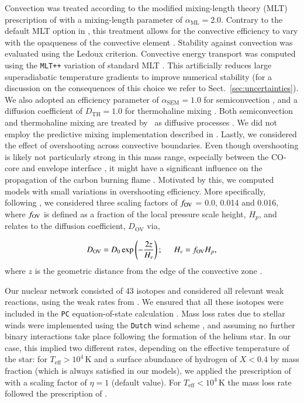 \documentclass[main.tex]{subfiles}
\begin{document}
Convection was treated according to the modified mixing-length theory (MLT) prescription of \cite{MLT_Henyey} with a mixing-length parameter of $\alpha_{\text{ML}} = 2.0$. Contrary to the default MLT option in \mesa, this treatment allows for the convective efficiency to vary with the opaqueness of the convective element \citep{Paxton:2010ji}. 
Stability against convection was evaluated using the Ledoux criterion. 
Convective energy transport was computed using the \texttt{MLT++} variation of standard MLT \citep{Paxton:2015jva}. This artificially reduces large  superadiabatic temperature gradients to improve numerical stability (for a discussion on the consequences of this choice we refer to Sect.~\ref{sec:uncertainties}). 
We also adopted an  efficiency parameter of $\alpha_{\text{SEM}} = 1.0$ for semiconvection \citep{Langer1991}, and a diffusion coefficient of  $D_{\text{TH}} = 1.0$ for thermohaline mixing \citep{Brown_2013}. Both semiconvection and thermohaline mixing are treated by \mesa\ as diffusive processes \citep{kippenhahn1980,Langer1983}. We did not employ the predictive mixing implementation  described in \cite{Paxton:2017eie}. Lastly, we considered the effect of  overshooting across convective boundaries. Even though overshooting is likely not particularly strong  in this mass range, especially between the CO-core and envelope interface \citep{Lecoanet:2016abca}, it might have a significant influence on the propagation of the carbon burning flame \citep{Farmer:2015afs}. Motivated by this, we computed models with small variations in overshooting efficiency. More specifically, following \cite{Jones2013apj}, we considered three scaling factors of $f_{\rm OV}$ = 0.0, 0.014 and 0.016, where $f_{\rm OV}$ is defined  as a fraction of the local pressure scale height, $H_p$, and relates to the diffusion coefficient, $D_{\text{OV}}$ via,


\begin{align}
	\label{eq:OV}
	D_{\text{OV}} = D_0 \exp \left( - \frac{2z}{H_v} \right); \hspace{0.5cm} H_v = f_{\text{OV}} H_p,
\end{align}
where $z$ is the geometric distance from the edge of the convective zone \citep{Herwig2000}. 


Our nuclear network consisted of 43 
isotopes and considered all  relevant weak reactions, using the 
weak rates from \cite{Suzuki2016}. We ensured that all these isotopes 
were  included in the \texttt{PC} equation-of-state calculation \citep[see][for details]{Schwab:2017epw}.
Mass loss rates due to stellar winds were implemented using the \texttt{Dutch} wind scheme \citep{Dutch}, and assuming no further binary interactions take place following the formation of the helium star. In our case, this implied two different rates, depending on the effective temperature of the star: for $T_{\text{eff}} > 10^4$\,K and a surface abundance of hydrogen of $X < 0.4$ by mass fraction (which is always satisfied in our models), we applied the prescription of \cite{Nugis2000} with a scaling factor of $\eta = 1$ (default value). For $T_{\text{eff}} < 10^4$\,K the mass loss rate followed the prescription of \cite{deJager1988}. 
\end{document}
